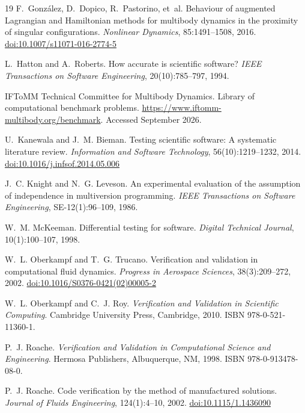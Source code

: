 \documentclass[review,12pt]{elsarticle}
\newcommand{\doi}[1]{\href{https://doi.org/#1}{doi:#1}}
\begin{document}
\begin{thebibliography}{19}
F.~Gonz\'alez, D.~Dopico, R.~Pastorino, et~al.
\newblock Behaviour of augmented Lagrangian and Hamiltonian methods for
  multibody dynamics in the proximity of singular configurations.
\newblock \emph{Nonlinear Dynamics}, 85:1491--1508, 2016.
  \newblock \doi{10.1007/s11071-016-2774-5}

L.~Hatton and A.~Roberts.
\newblock How accurate is scientific software?
\newblock \emph{IEEE Transactions on Software Engineering}, 20(10):785--797,
  1994.

IFToMM Technical Committee for Multibody Dynamics.
\newblock Library of computational benchmark problems.
\newblock \url{https://www.iftomm-multibody.org/benchmark}.
  \newblock Accessed September 2026.

U.~Kanewala and J.~M. Bieman.
\newblock Testing scientific software: A systematic literature review.
\newblock \emph{Information and Software Technology}, 56(10):1219--1232, 2014.
  \newblock \doi{10.1016/j.infsof.2014.05.006}

J.~C. Knight and N.~G. Leveson.
\newblock An experimental evaluation of the assumption of independence in
  multiversion programming.
\newblock \emph{IEEE Transactions on Software Engineering}, SE-12(1):96--109,
  1986.

W.~M. McKeeman.
\newblock Differential testing for software.
\newblock \emph{Digital Technical Journal}, 10(1):100--107, 1998.

W.~L. Oberkampf and T.~G. Trucano.
\newblock Verification and validation in computational fluid dynamics.
\newblock \emph{Progress in Aerospace Sciences}, 38(3):209--272, 2002.
  \newblock \doi{10.1016/S0376-0421(02)00005-2}

W.~L. Oberkampf and C.~J. Roy.
\newblock \emph{Verification and Validation in Scientific Computing}.
\newblock Cambridge University Press, Cambridge, 2010.
  \newblock ISBN 978-0-521-11360-1.

P.~J. Roache.
\newblock \emph{Verification and Validation in Computational Science and
  Engineering}.
\newblock Hermosa Publishers, Albuquerque, NM, 1998.
  \newblock ISBN 978-0-913478-08-0.

P.~J. Roache.
\newblock Code verification by the method of manufactured solutions.
\newblock \emph{Journal of Fluids Engineering}, 124(1):4--10, 2002.
  \newblock \doi{10.1115/1.1436090}

\end{thebibliography}
\end{document}
